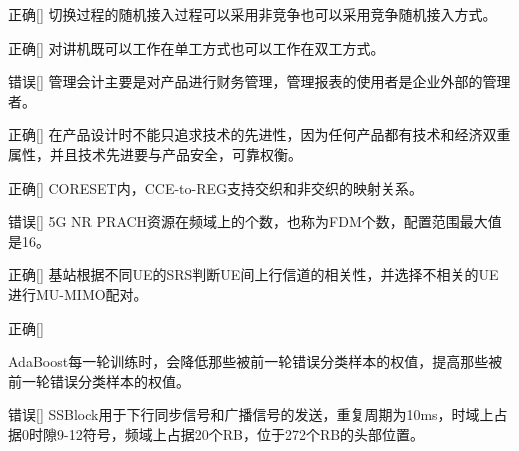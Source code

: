 \begin{choice}{\;正确\;}[]
    切换过程的随机接入过程可以采用非竞争也可以采用竞争随机接入方式。
\end{choice}

\begin{choice}{\;正确\;}[]
    对讲机既可以工作在单工方式也可以工作在双工方式。
\end{choice}

\begin{choice}{\;错误\;}[]
    管理会计主要是对产品进行财务管理，管理报表的使用者是企业外部的管理者。
\end{choice}

\begin{choice}{\;正确\;}[]
    在产品设计时不能只追求技术的先进性，因为任何产品都有技术和经济双重属性，并且技术先进要与产品安全，可靠权衡。
\end{choice}

\begin{choice}{\;正确\;}[]
    CORESET内，CCE-to-REG支持交织和非交织的映射关系。

\end{choice}


\begin{choice}{\;错误\;}[]
    5G NR PRACH资源在频域上的个数，也称为FDM个数，配置范围最大值是16。

\end{choice}

\begin{choice}{\;正确\;}[]
    基站根据不同UE的SRS判断UE间上行信道的相关性，并选择不相关的UE进行MU-MIMO配对。

\end{choice}

\begin{choice}{\;正确\;}[]

    AdaBoost每一轮训练时，会降低那些被前一轮错误分类样本的权值，提高那些被前一轮错误分类样本的权值。
\end{choice}


\begin{choice}{\;错误\;}[]
    SSBlock用于下行同步信号和广播信号的发送，重复周期为10ms，时域上占据0时隙9-12符号，频域上占据20个RB，位于272个RB的头部位置。

\end{choice}











